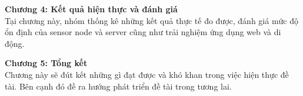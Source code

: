 \textbf{Chương 4: Kết quả hiện thực và đánh giá}\\
Tại chương này, nhóm thống kê những kết quả thực tế đo được, đánh giá mức độ ổn định của sensor node và server cũng như trải nghiệm ứng dụng web và di động.

\textbf{Chương 5: Tổng kết}\\
Chương này sẽ đút kết những gì đạt được và khó khan trong việc hiện thực đề tài. Bên cạnh đó đề ra hướng phát triển đề tài trong tương lai.